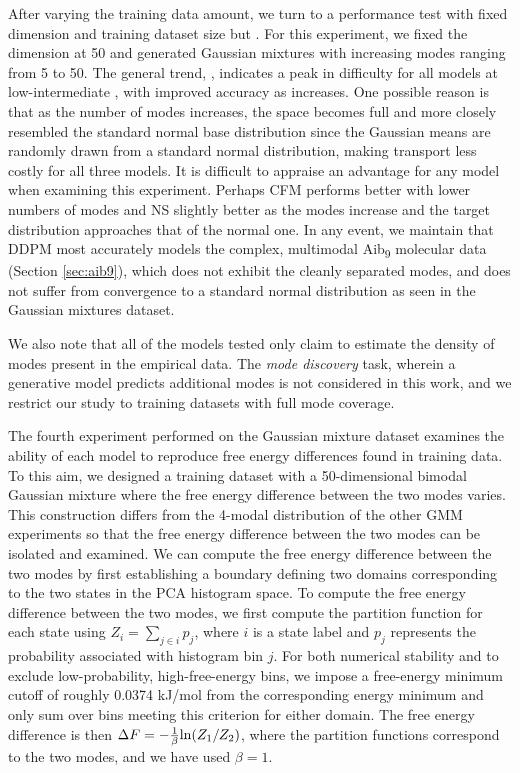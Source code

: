 \documentclass[%
 aip,
 amsmath,amssymb,
 reprint,%
]{revtex4-1}
\newcommand{\rj}[1]{{\color{red}{#1}}}
\begin{document}
After varying the training data amount, we turn to a performance test with fixed dimension and training dataset size but \rj{a varying number of modes}. For this experiment, we fixed the dimension at 50 and generated Gaussian mixtures with increasing modes ranging from 5 to 50. The general trend, \rj{shown in Figure \ref{fig:panel gmm modes}}, indicates a peak in difficulty for all models at low-intermediate \rj{multimodality}, with improved accuracy as \rj{the number of modes} increases. One possible reason is that as the number of modes increases, the space becomes full and more closely resembled the standard normal base distribution since the Gaussian means are randomly drawn from a standard normal distribution, making transport less costly for all three models. It is difficult to appraise an advantage for any model when examining this experiment. Perhaps CFM performs better with lower numbers of modes and NS slightly better as the modes increase and the target distribution approaches that of the normal one. In any event, we maintain that DDPM most accurately models the complex, multimodal Aib\textsubscript{9} molecular data (Section \ref{sec:aib9}), which does not exhibit the cleanly separated modes, and does not suffer from convergence to a standard normal distribution as seen in the Gaussian mixtures dataset.

We also note that all of the models tested only claim to estimate the density of modes present in the empirical data. The {\it mode discovery} task, wherein a generative model predicts additional modes is not considered in this work, and we restrict our study to training datasets with full mode coverage.

The fourth experiment performed on the Gaussian mixture dataset examines the ability of each model to reproduce free energy differences found in training data. To this aim, we designed a training dataset with a 50-dimensional bimodal Gaussian mixture where the free energy difference between the two modes varies. This construction differs from the 4-modal distribution of the other GMM experiments so that the free energy difference between the two modes can be isolated and examined. We can compute the free energy difference between the two modes by first establishing a boundary defining two domains corresponding to the two states in the PCA histogram space. To compute the free energy difference between the two modes, we first compute the partition function for each state using $Z_i = \sum_{j \in i} p_j$, where $i$ is a state label and $p_j$ represents the probability associated with histogram bin $j$. For both numerical stability and to exclude low-probability, high-free-energy bins, we impose a free-energy minimum cutoff of roughly 0.0374 kJ/mol from the corresponding energy minimum and only sum over bins meeting this criterion for either domain. The free energy difference is then $\Delta F = -{1 \over \beta} \mathrm{ln} (Z_1/Z_2)$, where the partition functions correspond to the two modes, and we have used $\beta=1$.
\end{document}

